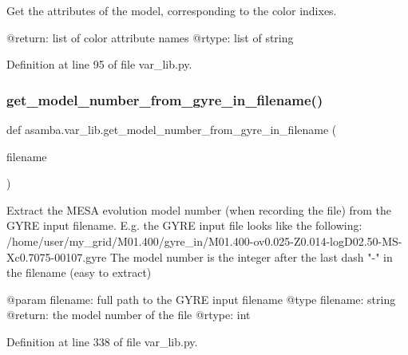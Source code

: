 \begin{DoxyVerb}Get the attributes of the model, corresponding to the color indixes.

@return: list of color attribute names
@rtype: list of string
\end{DoxyVerb}
 

Definition at line 95 of file var\+\_\+lib.\+py.

\mbox{\label{namespaceasamba_1_1var__lib_a311dce219a4bfcd63933f8f319aa03ce}} 
\subsubsection{\texorpdfstring{get\+\_\+model\+\_\+number\+\_\+from\+\_\+gyre\+\_\+in\+\_\+filename()}{get\_model\_number\_from\_gyre\_in\_filename()}}
{\footnotesize\ttfamily def asamba.\+var\+\_\+lib.\+get\+\_\+model\+\_\+number\+\_\+from\+\_\+gyre\+\_\+in\+\_\+filename (\begin{DoxyParamCaption}\item[{}]{filename }\end{DoxyParamCaption})}

\begin{DoxyVerb}Extract the MESA evolution model number (when recording the file) from the GYRE input filename.
E.g. the GYRE input file looks like the following:
/home/user/my_grid/M01.400/gyre_in/M01.400-ov0.025-Z0.014-logD02.50-MS-Xc0.7075-00107.gyre
The model number is the integer after the last dash "-" in the filename (easy to extract)

@param filename: full path to the GYRE input filename
@type filename: string
@return: the model number of the file
@rtype: int
\end{DoxyVerb}
 

Definition at line 338 of file var\+\_\+lib.\+py.

\mbox{\label{namespaceasamba_1_1var__lib_adc463e39504e5cd7acb15d499dec2880}} 
